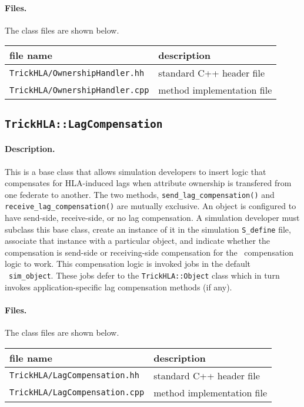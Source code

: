 \paragraph{Files.}
The class files are shown below.
   
{
  \scriptsize
  \begin{tabular}{|l|l|} 
    \hline
    file name & description \\
    \hline \hline
    {\tt TrickHLA/OwnershipHandler.hh} 
    & standard C++ header file
    \\ \hline
    {\tt TrickHLA/OwnershipHandler.cpp} 
    & method implementation file
    \\ \hline
  \end{tabular}
}

\subsection{{\tt TrickHLA::LagCompensation}}

\paragraph{Description.}
This is a base class that allows simulation developers to insert logic
that compensates for HLA-induced lags when attribute ownership is transfered
from one federate to another.
The two methods,
{\tt send\_lag\_compensation()} and {\tt receive\_lag\_compensation()}
are mutually exclusive.
An object is configured to have send-side, receive-side, or no lag compensation.
A simulation developer must subclass this base class, create an instance
of it in the simulation {\tt S\_define} file, associate that instance
with a particular object, and indicate whether the compensation is send-side
or receiving-side compensation for the \TrickHLA\ compensation logic to work.
This compensation logic is invoked jobs in the default \TrickHLA\ 
{\tt sim\_object}.  These jobs defer to the {\tt TrickHLA::Object} class 
which in turn invokes application-specific lag compensation methods (if any).

\paragraph{Files.}
The class files are shown below.
   
{
  \scriptsize
  \begin{tabular}{|l|l|} 
    \hline
    file name & description \\
    \hline \hline
    {\tt TrickHLA/LagCompensation.hh} 
    & standard C++ header file
    \\ \hline
    {\tt TrickHLA/LagCompensation.cpp} 
    & method implementation file
    \\ \hline
  \end{tabular}
}

